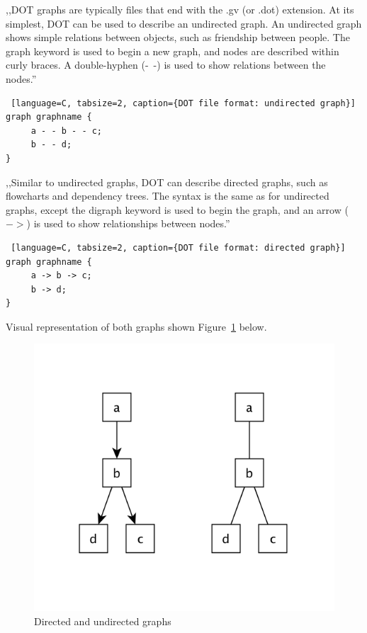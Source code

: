 ,,DOT graphs are typically files that end with the .gv (or .dot) extension. At its simplest, DOT can be used to describe an undirected graph. An undirected graph shows simple relations between objects, such as friendship between people. The graph keyword is used to begin a new graph, and nodes are described within curly braces. A double-hyphen (-\ -) is used to show relations between the nodes.''~\cite{DOT}

\begin{center}
\begin{lstlisting} [language=C, tabsize=2, caption={DOT file format: undirected graph}]
graph graphname {
     a - - b - - c;
     b - - d;
}
\end{lstlisting}
\end{center}

,,Similar to undirected graphs, DOT can describe directed graphs, such as flowcharts and dependency trees. The syntax is the same as for undirected graphs, except the digraph keyword is used to begin the graph, and an arrow ($->$) is used to show relationships between nodes.''~\cite{DOT}

\begin{center}
\begin{lstlisting} [language=C, tabsize=2, caption={DOT file format: directed graph}]
graph graphname {
     a -> b -> c;
     b -> d;
}
\end{lstlisting}
\end{center}

Visual representation of both graphs shown Figure~\ref{fig:dot_graphs} below.

\begin{figure}[h!]
\centering
\includegraphics[scale=0.3]{pictures/dot_graph.png}
\caption{Directed and undirected graphs}
\label{fig:dot_graphs}
\end{figure}


